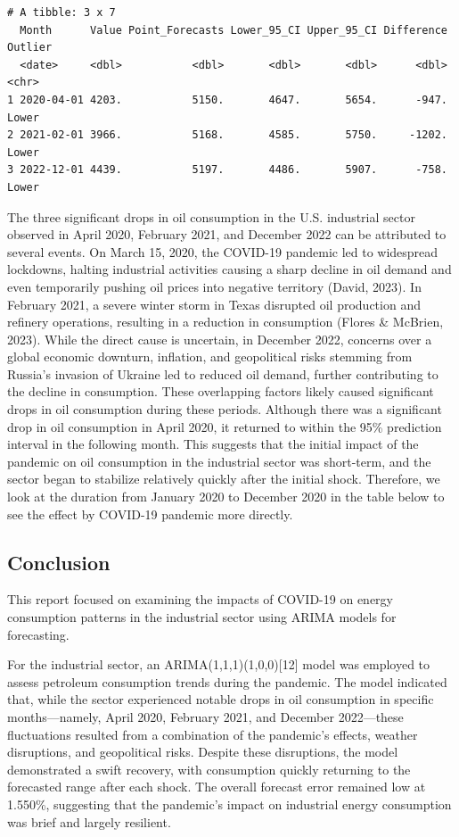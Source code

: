 \documentclass[
  letterpaper,
  DIV=11,
  numbers=noendperiod]{scrartcl}
\begin{document}
\begin{verbatim}
# A tibble: 3 x 7
  Month      Value Point_Forecasts Lower_95_CI Upper_95_CI Difference Outlier
  <date>     <dbl>           <dbl>       <dbl>       <dbl>      <dbl> <chr>  
1 2020-04-01 4203.           5150.       4647.       5654.      -947. Lower  
2 2021-02-01 3966.           5168.       4585.       5750.     -1202. Lower  
3 2022-12-01 4439.           5197.       4486.       5907.      -758. Lower  
\end{verbatim}

The three significant drops in oil consumption in the U.S. industrial
sector observed in April 2020, February 2021, and December 2022 can be
attributed to several events. On March 15, 2020, the COVID-19 pandemic
led to widespread lockdowns, halting industrial activities causing a
sharp decline in oil demand and even temporarily pushing oil prices into
negative territory (David, 2023). In February 2021, a severe winter
storm in Texas disrupted oil production and refinery operations,
resulting in a reduction in consumption (Flores \& McBrien, 2023). While
the direct cause is uncertain, in December 2022, concerns over a global
economic downturn, inflation, and geopolitical risks stemming from
Russia's invasion of Ukraine led to reduced oil demand, further
contributing to the decline in consumption. These overlapping factors
likely caused significant drops in oil consumption during these periods.
Although there was a significant drop in oil consumption in April 2020,
it returned to within the 95\% prediction interval in the following
month. This suggests that the initial impact of the pandemic on oil
consumption in the industrial sector was short-term, and the sector
began to stabilize relatively quickly after the initial shock.
Therefore, we look at the duration from January 2020 to December 2020 in
the table below to see the effect by COVID-19 pandemic more directly.

\subsection{Conclusion}\label{conclusion}

This report focused on examining the impacts of COVID-19 on energy
consumption patterns in the industrial sector using ARIMA models for
forecasting.

For the industrial sector, an ARIMA(1,1,1)(1,0,0){[}12{]} model was
employed to assess petroleum consumption trends during the pandemic. The
model indicated that, while the sector experienced notable drops in oil
consumption in specific months---namely, April 2020, February 2021, and
December 2022---these fluctuations resulted from a combination of the
pandemic's effects, weather disruptions, and geopolitical risks. Despite
these disruptions, the model demonstrated a swift recovery, with
consumption quickly returning to the forecasted range after each shock.
The overall forecast error remained low at 1.550\%, suggesting that the
pandemic's impact on industrial energy consumption was brief and largely
resilient.
\end{document}
